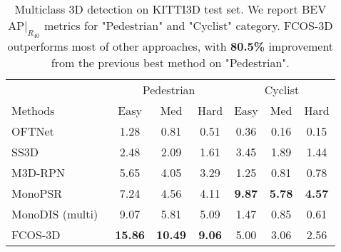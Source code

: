 
\begin{table}[t!]
\centering
{
\footnotesize
\setlength{\tabcolsep}{0.4em}
\begin{tabular}{l|ccc|ccc}
\toprule
& \multicolumn{3}{c}{Pedestrian} & \multicolumn{3}{c}{Cyclist} \\ 
\multirow{-2}{*}{Methods}& 
Easy & 
Med &
Hard &
Easy & Med & Hard \vspace{0.5mm}\\
\midrule
OFTNet~\cite{} &
1.28 &
0.81 &
0.51 &
0.36 &
0.16 &
0.15 
\\
SS3D~\cite{} &
2.48 &
2.09 &
1.61 &
3.45 &
1.89 &
1.44 
\\
M3D-RPN~\cite{} &
5.65 &
4.05 &
3.29 &
1.25 &
0.81 &
0.78 
\\
MonoPSR~\cite{} &
7.24 &
4.56 &
4.11 &
\textbf{9.87} &
\textbf{5.78} &
\textbf{4.57} 
\\
MonoDIS (multi)~\cite{simonelli2020disentangling} & 
9.07 & 
5.81 &
5.09 &
1.47 &
0.85 &
0.61
\\
\midrule
FCOS-3D & 
\textbf{15.86} & 
\textbf{10.49} &
\textbf{9.06} &
5.00 &
3.06 &
2.56
\\
\bottomrule
\end{tabular}\\\vspace{0mm}
\caption{
Multiclass 3D detection on KITTI3D test set. We report BEV AP$|_{R_{40}}$ metrics for "Pedestrian" and "Cyclist" category. FCOS-3D outperforms most of other approaches, with \textbf{80.5\%} improvement from the previous best method on "Pedestrian".}
\label{table:kitti_3d_test_multi_class}
}
\end{table}
